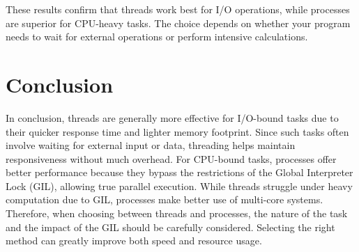\documentclass[onecolumn]{article}
\begin{document}
These results confirm that threads work best for I/O operations, while processes are superior for CPU-heavy tasks. The choice depends on whether your program needs to wait for external operations or perform intensive calculations.

 


\section{Conclusion}
In conclusion, threads are generally more effective for I/O-bound tasks due to their quicker response time and lighter memory footprint. Since such tasks often involve waiting for external input or data, threading helps maintain responsiveness without much overhead. For CPU-bound tasks, processes offer better performance because they bypass the restrictions of the Global Interpreter Lock (GIL), allowing true parallel execution. While threads struggle under heavy computation due to GIL, processes make better use of multi-core systems. Therefore, when choosing between threads and processes, the nature of the task and the impact of the GIL should be carefully considered. Selecting the right method can greatly improve both speed and resource usage. 


\nocite{*}


\end{document}
